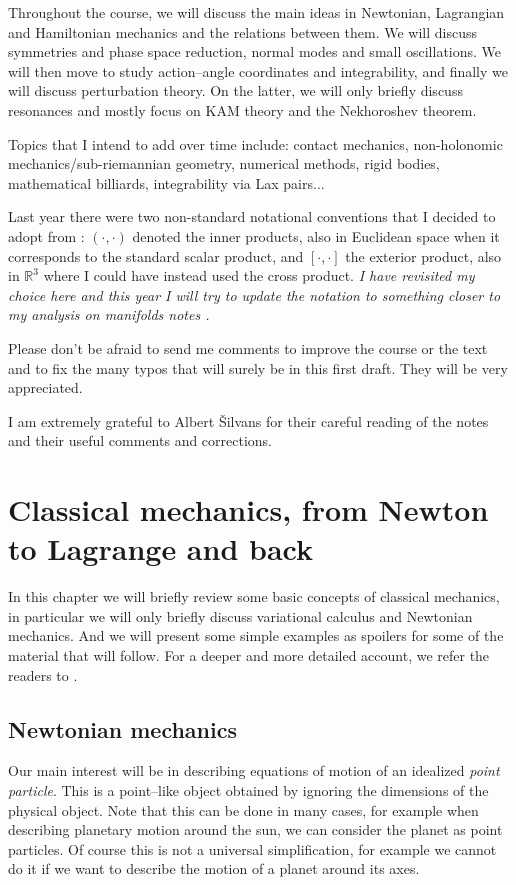 \documentclass[english,fontsize=11pt,paper=a5,oneside]{scrbook}
\newcommand{\R}{\mathbb{R}}
\theoremstyle{definition}
\begin{document}
Throughout the course, we will discuss the main ideas in Newtonian, Lagrangian and Hamiltonian mechanics and the relations between them.
We will discuss symmetries and phase space reduction, normal modes and small oscillations.
We will then move to study action--angle coordinates and integrability, and finally we will discuss perturbation theory.
On the latter, we will only briefly discuss resonances and mostly focus on KAM theory and the Nekhoroshev theorem.

Topics that I intend to add over time include: contact mechanics, non-holonomic mechanics/sub-riemannian geometry, numerical methods, rigid bodies, mathematical billiards, integrability via Lax pairs...

Last year there were two non-standard notational conventions that I decided to adopt from \cite{book:arnold}: $(\cdot,\cdot)$ denoted the inner products, also in Euclidean space when it corresponds to the standard scalar product, and $[\cdot,\cdot]$ the exterior product, also in $\R^3$ where I could have instead used the cross product. \emph{I have revisited my choice here and this year I will try to update the notation to something closer to my analysis on manifolds notes \cite{lectures:aom:seri}.}

Please don't be afraid to send me comments to improve the course or the text and to fix the many typos that will surely be in this first draft. They will be very appreciated.

I am extremely grateful to Albert \v{S}ilvans for their careful reading of the notes and their useful comments and corrections.

\chapter{Classical mechanics, from Newton to Lagrange and back}

In this chapter we will briefly review some basic concepts of classical mechanics, in particular we will only briefly discuss variational calculus and Newtonian mechanics.
And we will present some simple examples as spoilers for some of the material that will follow.
For a deeper and more detailed account, we refer the readers to \cite{book:arnold,book:knauf}.

\section{Newtonian mechanics}

Our main interest will be in describing equations of motion of an idealized \emph{point particle}.
This is a point--like object obtained by ignoring the dimensions of the physical object. Note that this can be done in many cases, for example when describing planetary motion around the sun, we can consider the planet as point particles.
Of course this is not a universal simplification, for example we cannot do it if we want to describe the motion of a planet around its axes.
\end{document}
